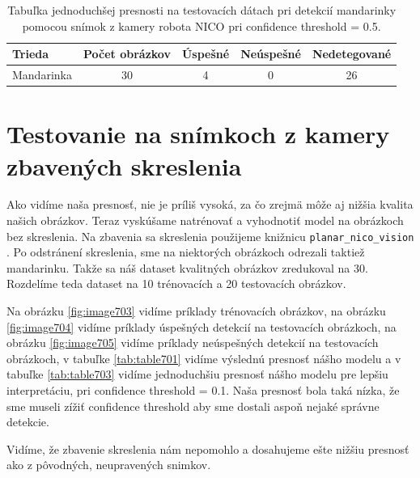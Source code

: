 \begin{table}[H]
\begin{tabular}{|l|c|c|c|c|}
\hline
\textbf{Trieda} & \textbf{Počet obrázkov} & \textbf{Úspešné} & \textbf{Neúspešné} &  \textbf{Nedetegované}\\
\hline
Mandarinka & 30 & 4 & 0 & 26 \\
\hline
\end{tabular}
\centering
\caption{Tabuľka jednoduchšej presnosti na testovacích dátach pri detekcií mandarinky pomocou snímok z kamery robota NICO pri confidence threshold = 0.5.}
\label{tab:table702}
\end{table}

\section{Testovanie na snímkoch z kamery zbavených skreslenia}

Ako vidíme naša presnosť, nie je príliš vysoká, za čo zrejmä môže aj nižšia kvalita našich obrázkov. Teraz vyskúšame natrénovať a vyhodnotiť model na obrázkoch bez skreslenia. Na zbavenia sa skreslenia použijeme knižnicu \texttt{planar\_nico\_vision} \cite{planarNicoVision}. Po odstránení skreslenia, sme na niektorých obrázkoch odrezali taktiež mandarinku. Takže sa náš dataset kvalitných obrázkov zredukoval na 30. Rozdelíme teda dataset na 10 trénovacích a 20 testovacích obrázkov. 

Na obrázku \ref{fig:image703} vidíme príklady trénovacích obrázkov, na obrázku \ref{fig:image704} vidíme príklady úspešných detekcií na testovacích obrázkoch, na obrázku \ref{fig:image705} vidíme príklady neúspešných detekcií na testovacích obrázkoch, v tabuľke \ref{tab:table701} vidíme výslednú presnosť nášho modelu a v tabuľke \ref{tab:table703} vidíme jednoduchšiu presnosť nášho modelu pre lepšiu interpretáciu, pri confidence threshold = 0.1. Naša presnosť bola taká nízka, že sme museli zížiť confidence threshold aby sme dostali aspoň nejaké správne detekcie.

Vidíme, že zbavenie skreslenia nám nepomohlo a dosahujeme ešte nižšiu presnosť ako z pôvodných, neupravených snimkov. 

